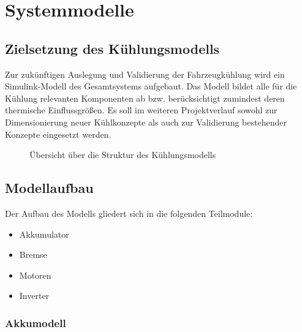 \chapter{Systemmodelle}
\label{ch:systemmodelle}

\section{Zielsetzung des Kühlungsmodells}
\label{sec:modell_ziel}

Zur zukünftigen Auslegung und Validierung der Fahrzeugkühlung wird ein
Simulink-Modell des Gesamtsystems aufgebaut. Das Modell bildet alle für die
Kühlung relevanten Komponenten ab bzw. berücksichtigt zumindest deren
thermische Einflussgrößen. Es soll im weiteren Projektverlauf sowohl zur
Dimensionierung neuer Kühlkonzepte als auch zur Validierung bestehender
Konzepte eingesetzt werden.

\begin{figure}[htbp]
    \centering
    \caption{Übersicht über die Struktur des Kühlungsmodells}
    \label{fig:modell_uebersicht}
\end{figure}

\section{Modellaufbau}
\label{sec:modellaufbau}

Der Aufbau des Modells gliedert sich in die folgenden Teilmodule:

\begin{itemize}
    \item Akkumulator
    \item Bremse
    \item Motoren
    \item Inverter
\end{itemize}


\subsection{Akkumodell}
\label{subsec:akkumodell}

